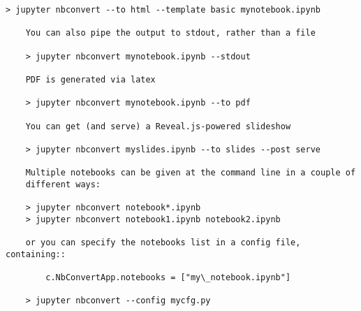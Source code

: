 \documentclass[11pt]{article}
\makeatletter
\newcommand{\boxspacing}{\kern\kvtcb@left@rule\kern\kvtcb@boxsep}
\newcommand{\prompt}[4]{
        \ttfamily\llap{{\color{#2}[#3]:\hspace{3pt}#4}}\vspace{-\baselineskip}
    }
\makeatother
\begin{document}
\begin{Verbatim}[commandchars=\\\{\}]
    > jupyter nbconvert --to html --template basic mynotebook.ipynb

    You can also pipe the output to stdout, rather than a file

    > jupyter nbconvert mynotebook.ipynb --stdout

    PDF is generated via latex

    > jupyter nbconvert mynotebook.ipynb --to pdf

    You can get (and serve) a Reveal.js-powered slideshow

    > jupyter nbconvert myslides.ipynb --to slides --post serve

    Multiple notebooks can be given at the command line in a couple of
    different ways:

    > jupyter nbconvert notebook*.ipynb
    > jupyter nbconvert notebook1.ipynb notebook2.ipynb

    or you can specify the notebooks list in a config file, containing::

        c.NbConvertApp.notebooks = ["my\_notebook.ipynb"]

    > jupyter nbconvert --config mycfg.py

    \end{Verbatim}

    \begin{tcolorbox}[breakable, size=fbox, boxrule=1pt, pad at break*=1mm,colback=cellbackground, colframe=cellborder]
\prompt{In}{incolor}{ }{\boxspacing}
\begin{Verbatim}[commandchars=\\\{\}]

\end{Verbatim}
\end{tcolorbox}


    
    
    
\end{document}
